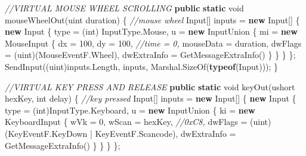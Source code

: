 \documentclass[
  openany]{book}
\newenvironment{Shaded}{\begin{snugshade}}{\end{snugshade}}
\newcommand{\CommentTok}[1]{\textcolor[rgb]{0.56,0.35,0.01}{\textit{#1}}}
\newcommand{\DataTypeTok}[1]{\textcolor[rgb]{0.13,0.29,0.53}{#1}}
\newcommand{\DecValTok}[1]{\textcolor[rgb]{0.00,0.00,0.81}{#1}}
\newcommand{\FunctionTok}[1]{\textcolor[rgb]{0.00,0.00,0.00}{#1}}
\newcommand{\KeywordTok}[1]{\textcolor[rgb]{0.13,0.29,0.53}{\textbf{#1}}}
\newcommand{\NormalTok}[1]{#1}
\begin{document}
\begin{Shaded}
\begin{Highlighting}[]
        \CommentTok{//VIRTUAL MOUSE WHEEL SCROLLING}
        \KeywordTok{public} \KeywordTok{static} \DataTypeTok{void} \FunctionTok{mouseWheelOut}\NormalTok{(}\DataTypeTok{uint}\NormalTok{ duration)}
\NormalTok{        \{}
            \CommentTok{//mouse wheel}
\NormalTok{            Input[] inputs = }\KeywordTok{new}\NormalTok{ Input[]}
\NormalTok{            \{}
                \KeywordTok{new}\NormalTok{ Input}
\NormalTok{                \{}
\NormalTok{                    type = (}\DataTypeTok{int}\NormalTok{) InputType.}\FunctionTok{Mouse}\NormalTok{,}
\NormalTok{                    u = }\KeywordTok{new}\NormalTok{ InputUnion}
\NormalTok{                    \{}
\NormalTok{                        mi = }\KeywordTok{new}\NormalTok{ MouseInput}
\NormalTok{                        \{}
\NormalTok{                            dx = }\DecValTok{100}\NormalTok{,}
\NormalTok{                            dy = }\DecValTok{100}\NormalTok{,}
                            \CommentTok{//time = 0,}
\NormalTok{                            mouseData = duration,}
\NormalTok{                            dwFlags = (}\DataTypeTok{uint}\NormalTok{)(MouseEventF.}\FunctionTok{Wheel}\NormalTok{),}
\NormalTok{                            dwExtraInfo = }\FunctionTok{GetMessageExtraInfo}\NormalTok{()}
\NormalTok{                        \}}
\NormalTok{                    \}}
\NormalTok{                \}}
\NormalTok{            \};}
            \FunctionTok{SendInput}\NormalTok{((}\DataTypeTok{uint}\NormalTok{)inputs.}\FunctionTok{Length}\NormalTok{, inputs, Marshal.}\FunctionTok{SizeOf}\NormalTok{(}\KeywordTok{typeof}\NormalTok{(Input)));}
\NormalTok{        \}}
        
        \CommentTok{//VIRTUAL KEY PRESS AND RELEASE}
        \KeywordTok{public} \KeywordTok{static} \DataTypeTok{void} \FunctionTok{keyOut}\NormalTok{(}\DataTypeTok{ushort}\NormalTok{ hexKey, }\DataTypeTok{int}\NormalTok{ delay)}
\NormalTok{        \{}
            \CommentTok{//key pressed}
\NormalTok{            Input[] inputs = }\KeywordTok{new}\NormalTok{ Input[]}
\NormalTok{            \{}
                \KeywordTok{new}\NormalTok{ Input}
\NormalTok{                \{}
\NormalTok{                    type = (}\DataTypeTok{int}\NormalTok{)InputType.}\FunctionTok{Keyboard}\NormalTok{,}
\NormalTok{                    u = }\KeywordTok{new}\NormalTok{ InputUnion}
\NormalTok{                    \{}
\NormalTok{                        ki = }\KeywordTok{new}\NormalTok{ KeyboardInput}
\NormalTok{                        \{}
\NormalTok{                            wVk = }\DecValTok{0}\NormalTok{,}
\NormalTok{                            wScan = hexKey, }\CommentTok{//0xC8,}
\NormalTok{                            dwFlags = (}\DataTypeTok{uint}\NormalTok{)(KeyEventF.}\FunctionTok{KeyDown}\NormalTok{ | KeyEventF.}\FunctionTok{Scancode}\NormalTok{),}
\NormalTok{                            dwExtraInfo = }\FunctionTok{GetMessageExtraInfo}\NormalTok{()}
\NormalTok{                        \}}
\NormalTok{                    \}}
\NormalTok{                \}}
\NormalTok{            \};}



\end{Highlighting}
\end{Shaded}
\end{document}
